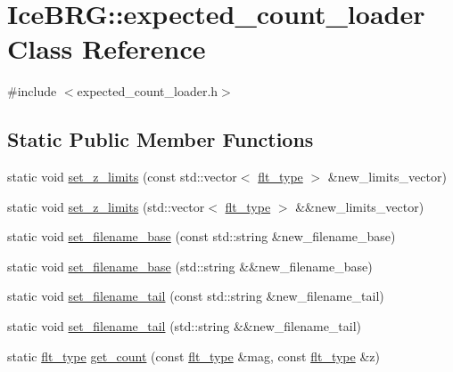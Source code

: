 \hypertarget{classIceBRG_1_1expected__count__loader}{}\section{Ice\+B\+R\+G\+:\+:expected\+\_\+count\+\_\+loader Class Reference}
\label{classIceBRG_1_1expected__count__loader}


{\ttfamily \#include $<$expected\+\_\+count\+\_\+loader.\+h$>$}

\subsection*{Static Public Member Functions}
\begin{DoxyCompactItemize}
\item 
static void \hyperlink{classIceBRG_1_1expected__count__loader_ad7e776799292cb4660f98384a2f4505f}{set\+\_\+z\+\_\+limits} (const std\+::vector$<$ \hyperlink{lib_2IceBRG__main_2common_8h_ad0f130a56eeb944d9ef2692ee881ecc4}{flt\+\_\+type} $>$ \&new\+\_\+limits\+\_\+vector)
\item 
static void \hyperlink{classIceBRG_1_1expected__count__loader_ae8b333ac395d75b65c145d606b5c159b}{set\+\_\+z\+\_\+limits} (std\+::vector$<$ \hyperlink{lib_2IceBRG__main_2common_8h_ad0f130a56eeb944d9ef2692ee881ecc4}{flt\+\_\+type} $>$ \&\&new\+\_\+limits\+\_\+vector)
\item 
static void \hyperlink{classIceBRG_1_1expected__count__loader_a5dcd85e898db66b1ebc3f50462388dd3}{set\+\_\+filename\+\_\+base} (const std\+::string \&new\+\_\+filename\+\_\+base)
\item 
static void \hyperlink{classIceBRG_1_1expected__count__loader_a8cae32efecceecb9d257ba4393f1ba21}{set\+\_\+filename\+\_\+base} (std\+::string \&\&new\+\_\+filename\+\_\+base)
\item 
static void \hyperlink{classIceBRG_1_1expected__count__loader_a0acbb6a0590f2b6447b0a9c9584a92eb}{set\+\_\+filename\+\_\+tail} (const std\+::string \&new\+\_\+filename\+\_\+tail)
\item 
static void \hyperlink{classIceBRG_1_1expected__count__loader_af8d28d202cf91f98301e60bc58f8582e}{set\+\_\+filename\+\_\+tail} (std\+::string \&\&new\+\_\+filename\+\_\+tail)
\item 
static \hyperlink{lib_2IceBRG__main_2common_8h_ad0f130a56eeb944d9ef2692ee881ecc4}{flt\+\_\+type} \hyperlink{classIceBRG_1_1expected__count__loader_a653df13eb1c195306d1369a391c26cdb}{get\+\_\+count} (const \hyperlink{lib_2IceBRG__main_2common_8h_ad0f130a56eeb944d9ef2692ee881ecc4}{flt\+\_\+type} \&mag, const \hyperlink{lib_2IceBRG__main_2common_8h_ad0f130a56eeb944d9ef2692ee881ecc4}{flt\+\_\+type} \&z)

\end{DoxyCompactItemize}
